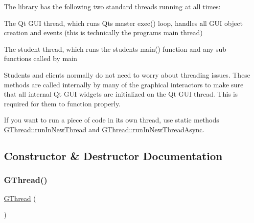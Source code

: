 The library has the following two standard threads running at all times\+:


\begin{DoxyEnumerate}
\item The Qt G\+UI thread, which runs Qt\textquotesingle{}s master exec() loop, handles all G\+UI object creation and events (this is technically the program\textquotesingle{}s main thread)


\item The student thread, which runs the student\textquotesingle{}s main() function and any sub-\/functions called by main 
\end{DoxyEnumerate}

Students and clients normally do not need to worry about threading issues. These methods are called internally by many of the graphical interactors to make sure that all internal Qt G\+UI widgets are initialized on the Qt G\+UI thread. This is required for them to function properly.

If you want to run a piece of code in its own thread, use static methods {\ttfamily \mbox{\hyperlink{classsgl_1_1GThread_ad70a32318f3f0a9cf25582379c6d7ffb}{G\+Thread\+::run\+In\+New\+Thread}}} and {\ttfamily \mbox{\hyperlink{classsgl_1_1GThread_aee1af0236d033fce36073899bb4368ed}{G\+Thread\+::run\+In\+New\+Thread\+Async}}}. 

\subsection{Constructor \& Destructor Documentation}
\mbox{\label{classsgl_1_1GThread_a7db4904140090c18f864e09283f2b529}} 
\subsubsection{\texorpdfstring{G\+Thread()}{GThread()}}
{\footnotesize\ttfamily \mbox{\hyperlink{classsgl_1_1GThread}{G\+Thread}} (\begin{DoxyParamCaption}{ }\end{DoxyParamCaption})\hspace{0.3cm}{\ttfamily [protected]}}

\mbox{\label{classsgl_1_1GThread_ae4f0a2859df75533269d8916c361855d}} 
